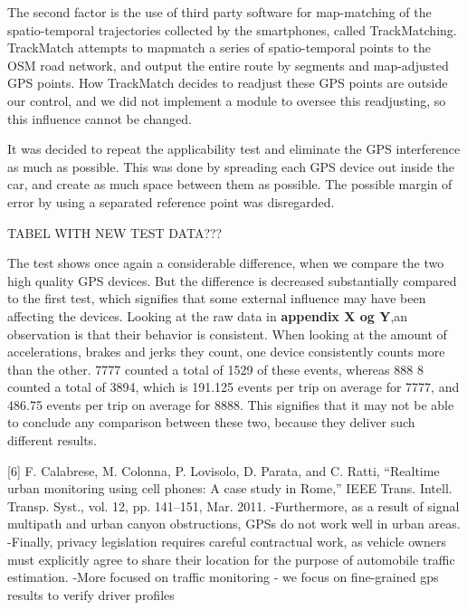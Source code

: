 The second factor is the use of third party software for map-matching of the spatio-temporal trajectories collected by the smartphones, called TrackMatching\citep{trackmatch}. TrackMatch attempts to mapmatch a series of spatio-temporal points to the OSM road network, and output the entire route by segments and map-adjusted GPS points. How TrackMatch decides to readjust these GPS points are outside our control, and we did not implement a module to oversee this readjusting, so this influence cannot be changed. 

It was decided to repeat the applicability test and eliminate the GPS interference as much as possible. This was done by spreading each GPS device out inside the car, and create as much space between them as possible. The possible margin of error by using a separated reference point was disregarded. 

TABEL WITH NEW TEST DATA???

The test shows once again a considerable difference, when we compare the two high quality GPS devices. But the difference is decreased substantially compared to the first test, which signifies that some external influence may have been affecting the devices. Looking at the raw data in \textbf{appendix X og Y},an observation is that their behavior is consistent. When looking at the amount of accelerations, brakes and jerks they count, one device consistently counts more than the other. 7777 counted a total of 1529 of these events, whereas 888 8 counted a total of 3894, which is 191.125 events per trip on average for 7777, and 486.75 events per trip on average for 8888. This signifies that it may not be able to conclude any comparison between these two, because they deliver such different results.









[6] F. Calabrese, M. Colonna, P. Lovisolo, D. Parata, and C. Ratti, “Realtime urban monitoring using cell phones: A case study in Rome,” IEEE Trans. Intell. Transp. Syst., vol. 12, pp. 141–151, Mar. 2011.
-Furthermore, as a result of signal multipath and urban canyon obstructions, GPSs do not work well in urban areas.
-Finally, privacy legislation requires careful contractual work, as vehicle owners must explicitly agree to share their location for the purpose of automobile traffic estimation.
-More focused on traffic monitoring - we focus on fine-grained gps results to verify driver profiles

